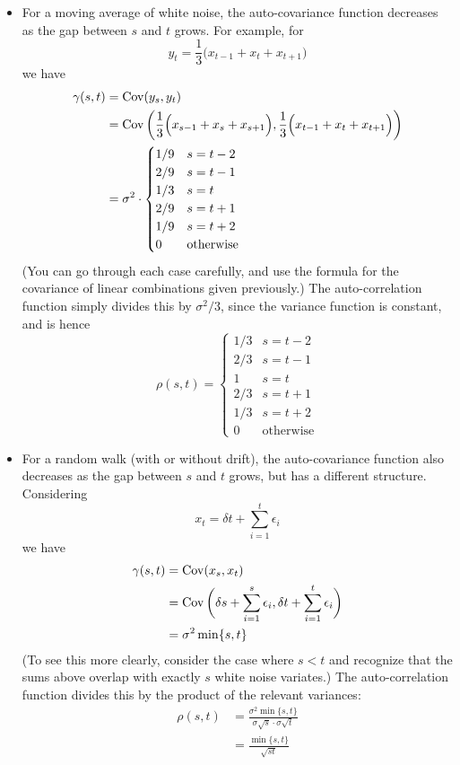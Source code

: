 \documentclass{article}
\begin{document}
\begin{itemize}
\item For a moving average of white noise, the auto-covariance function
  decreases as the gap between $s$ and $t$ grows. For example, for  
  \[
  y_t = \frac{1}{3} \Big( x_{t-1} + x_t + x_{t+1} \Big)
  \]
  we have
  \begin{align*}
  \gamma(s,t) &= \operatorname{Cov}(y_s, y_t) \\
  &= \operatorname{Cov} \bigg( \frac{1}{3} \Big( x_{s-1} + x_s + x_{s+1} \Big), 
    \frac{1}{3} \Big( x_{t-1} + x_t + x_{t+1} \Big) \bigg) \\
  &=  \sigma^2 \cdot 
  \begin{cases}
  1 / 9 & s = t-2 \\
  2 / 9 & s = t-1 \\
  1 / 3 & s = t \\
  2 / 9 & s = t+1 \\
  1 / 9 & s = t+2 \\
  0 & \text{otherwise}
  \end{cases}
  \end{align*}
  (You can go through each case carefully, and use the formula for the
  covariance of linear combinations given previously.) The auto-correlation
  function simply divides this by $\sigma^2 / 3$, since the variance function is 
  constant, and is hence
  \[
  \rho(s,t) = 
  \begin{cases}
  1 / 3 & s = t-2 \\
  2 / 3 & s = t-1 \\
  1 & s = t \\
  2 / 3 & s = t+1 \\
  1 / 3 & s = t+2 \\
  0 & \text{otherwise}
  \end{cases}
  \]

\item For a random walk (with or without drift), the auto-covariance function
  also decreases as the gap between $s$ and $t$ grows, but has a different 
  structure. Considering 
  \[
  x_t = \delta t + \sum_{i=1}^t \epsilon_i
  \]
  we have
  \begin{align*}
  \gamma(s,t) &= \operatorname{Cov}(x_s, x_t) \\
  &= \operatorname{Cov} \bigg( \delta s + \sum_{i=1}^s \epsilon_i, 
  \delta t + \sum_{i=1}^t \epsilon_i \bigg) \\
  &= \sigma^2 \min\{s, t\}
  \end{align*}
  (To see this more clearly, consider the case where $s<t$ and recognize that 
  the sums above overlap with exactly $s$ white noise variates.) The
  auto-correlation function divides this by the product of the relevant
  variances: 
  \begin{align*}
  \rho(s,t) &= \frac{\sigma^2 \min\{s, t\}}{\sigma \sqrt{s} \cdot \sigma 
              \sqrt{t}} \\  
  &= \frac{\min\{s, t\}}{\sqrt{st}}
  \end{align*}


\end{itemize}
\end{document}

